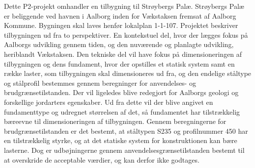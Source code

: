 Dette P2-projekt omhandler en tilbygning til Strøybergs Palæ. Strøybergs Palæ er beliggende ved havnen i Aalborg inden for Vækstaksen fremsat af Aalborg Kommune. Bygningen skal laves henfør lokalplan 1-1-107. Projektet beskriver tilbygningen ud fra to perspektiver. En kontekstuel del, hvor der lægges fokus på Aalborgs udvikling gennem tiden, og den nuværende og planlagte udvikling, heriblandt Vækstaksen. Den tekniske del vil have fokus på dimensioneringen af tilbygningen og dens fundament, hvor der opstilles et statisk system samt en række laster, som tilbygningen skal dimensioneres ud fra, og den endelige ståltype og stålprofil bestemmes gennem beregninger for anvendelses- og brudgrænsetilstanden. Der vil ligeledes blive redegjort for Aalborgs geologi og forskellige jordarters egenskaber. Ud fra dette vil der blive angivet en fundamenttype og udregnet størrelsen af det, så fundamentet har tilstrækkelig bæreevne til dimensioneringen af tilbygningen. Gennem beregningerne for brudgrænsetilstanden er det bestemt, at ståltypen S235 og profilnummer 450 har en tilstrækkelig styrke, og at det statiske system for konstruktionen kan bære lasterne. Dog er udbøjningerne gennem anvendelsesgrænsetilstanden bestemt til at overskride de acceptable værdier, og kan derfor ikke godtages.